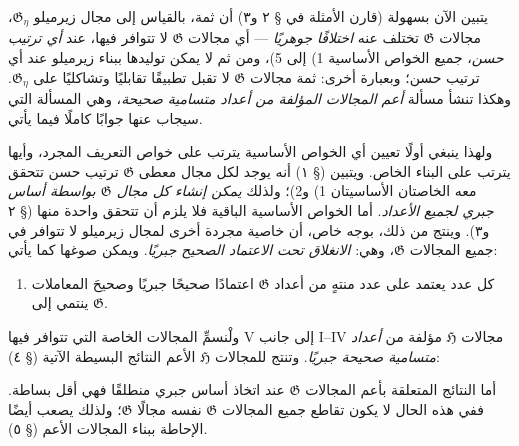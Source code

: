 \documentclass[11pt]{article}
\newcommand{\srcLTR}[1]{\relax\ifmmode\text{\mbox{\babelsublr{\foreignlanguage{english}{#1}}}}\else\babelsublr{\foreignlanguage{english}{#1}}\fi}
\newcommand{\srcfn}[2]{\begingroup\renewcommand{\thefootnote}{\srcLTR{#1}}\footnote{#2}\addtocounter{footnote}{-1}\endgroup}
\begin{document}
يتبين الآن بسهولة (قارن الأمثلة في § ٢ و٣) أن ثمة، بالقياس إلى مجال زيرميلو
$\mathfrak G_\eta$، مجالات $\mathfrak G$ تختلف عنه
\emph{اختلافًا جوهريًا} --- أي مجالات $\mathfrak G$ لا تتوافر فيها، عند
\emph{أي ترتيب حسن}، جميع الخواص الأساسية 1) إلى 5)، ومن ثم لا يمكن
توليدها ببناء زيرميلو عند أي ترتيب حسن؛ وبعبارة أخرى: ثمة مجالات
$\mathfrak G$ لا تقبل تطبيقًا تقابليًا وتشاكليًا على $\mathfrak G_\eta$.
وهكذا تنشأ مسألة \emph{أعم المجالات المؤلفة من أعداد متسامية صحيحة}،
وهي المسألة التي سيجاب عنها جوابًا كاملًا فيما يأتي.

ولهذا ينبغي أولًا تعيين أي الخواص الأساسية يترتب على خواص التعريف المجرد،
وأيها يترتب على البناء الخاص. ويتبين (§ ١) أنه يوجد لكل مجال معطى
$\mathfrak G$ ترتيب حسن تتحقق معه الخاصتان الأساسيتان 1) و2)؛ ولذلك
\emph{يمكن إنشاء كل مجال $\mathfrak G$ بواسطة أساس جبري لجميع الأعداد}.
أما الخواص الأساسية الباقية فلا يلزم أن تتحقق واحدة منها (§ ٢ و٣). وينتج
من ذلك، بوجه خاص، أن خاصية مجردة أخرى لمجال زيرميلو لا تتوافر في جميع
المجالات $\mathfrak G$، وهي: \emph{الانغلاق تحت الاعتماد الصحيح جبريًا}.
ويمكن صوغها كما يأتي:
\begin{enumerate}
\item[V.] كل عدد يعتمد على عدد منتهٍ من أعداد $\mathfrak G$ اعتمادًا صحيحًا
جبريًا وصحيحَ المعاملات ينتمي إلى $\mathfrak G$.
\end{enumerate}

ولْنسمِّ المجالات الخاصة التي تتوافر فيها V إلى جانب I--IV مجالات
$\mathfrak H$ مؤلفة من \emph{أعداد متسامية صحيحة جبريًا}. وتنتج للمجالات
$\mathfrak H$ الأعم النتائج البسيطة الآتية (§ ٤):

أما النتائج المتعلقة بأعم المجالات $\mathfrak G$ عند اتخاذ أساس جبري منطلقًا
فهي أقل بساطة. ففي هذه الحال لا يكون تقاطع جميع المجالات $\mathfrak G$ نفسه
مجالًا $\mathfrak G$؛ ولذلك يصعب أيضًا الإحاطة ببناء المجالات الأعم (§ ٥).
\end{document}
